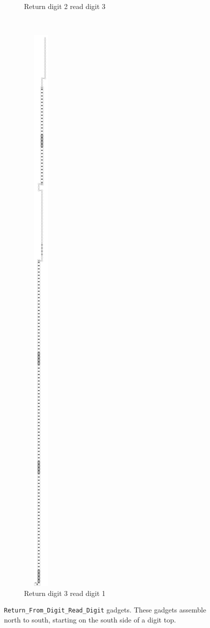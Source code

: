 \begin{figure}[H]
\begin{subfigure}[t]{0.2\textwidth}
        \caption{\label{fig:return_digit2_read_digit3_general} Return digit 2 read digit 3}
    \end{subfigure}%
    ~
    \begin{subfigure}[t]{0.2\textwidth}
        \centering
        \includegraphics[width=0.2\textwidth]{return_paths/return_digit3_read_digit1_general}
        \caption{\label{fig:return_digit3_read_digit1_general} Return digit 3 read digit 1}
    \end{subfigure}%
    \caption{\label{fig:return_path_same_row} {\tt Return\_From\_Digit\_Read\_Digit} gadgets. These gadgets assemble north to south, starting on the south side of a digit top.}
\end{figure}

